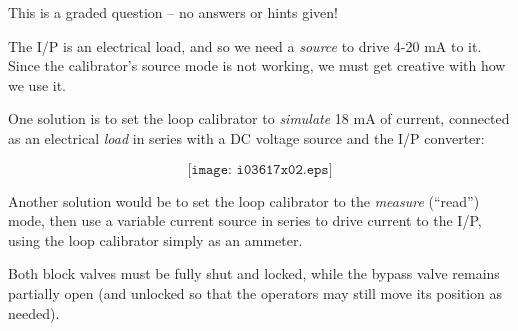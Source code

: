 This is a graded question -- no answers or hints given!







The I/P is an electrical load, and so we need a {\it source} to drive 4-20 mA to it.  Since the calibrator's source mode is not working, we must get creative with how we use it. 

One solution is to set the loop calibrator to {\it simulate} 18 mA of current, connected as an electrical {\it load} in series with a DC voltage source and the I/P converter:

$$\texttt{[image: i03617x02.eps]}$$

Another solution would be to set the loop calibrator to the {\it measure} (``read'') mode, then use a variable current source in series to drive current to the I/P, using the loop calibrator simply as an ammeter.

\vskip 10pt

Both block valves must be fully shut and locked, while the bypass valve remains partially open (and unlocked so that the operators may still move its position as needed).




